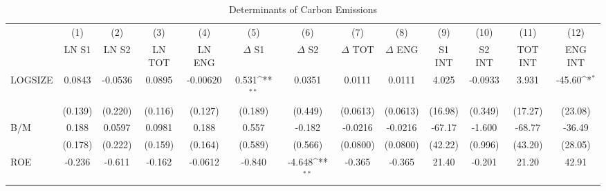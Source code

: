 \begin{table}[htbp]\centering
\def\sym#1{\ifmmode^{#1}\else\(^{#1}\)\fi}
\caption{Determinants of Carbon Emissions}
\begin{tabular}{l*{12}{c}}
\hline\hline
                    &\multicolumn{1}{c}{(1)}&\multicolumn{1}{c}{(2)}&\multicolumn{1}{c}{(3)}&\multicolumn{1}{c}{(4)}&\multicolumn{1}{c}{(5)}&\multicolumn{1}{c}{(6)}&\multicolumn{1}{c}{(7)}&\multicolumn{1}{c}{(8)}&\multicolumn{1}{c}{(9)}&\multicolumn{1}{c}{(10)}&\multicolumn{1}{c}{(11)}&\multicolumn{1}{c}{(12)}\\
                    &\multicolumn{1}{c}{LN S1}&\multicolumn{1}{c}{LN S2}&\multicolumn{1}{c}{LN TOT}&\multicolumn{1}{c}{LN ENG}&\multicolumn{1}{c}{$\Delta$ S1}&\multicolumn{1}{c}{$\Delta$ S2}&\multicolumn{1}{c}{$\Delta$ TOT}&\multicolumn{1}{c}{$\Delta$ ENG}&\multicolumn{1}{c}{S1 INT}&\multicolumn{1}{c}{S2 INT}&\multicolumn{1}{c}{TOT INT}&\multicolumn{1}{c}{ENG INT}\\
\hline
LOGSIZE             &      0.0843         &     -0.0536         &      0.0895         &    -0.00620         &       0.531\sym{**} &      0.0351         &      0.0111         &      0.0111         &       4.025         &     -0.0933         &       3.931         &      -45.60\sym{*}  \\
                    &     (0.139)         &     (0.220)         &     (0.116)         &     (0.127)         &     (0.189)         &     (0.449)         &    (0.0613)         &    (0.0613)         &     (16.98)         &     (0.349)         &     (17.27)         &     (23.08)         \\
B/M                 &       0.188         &      0.0597         &      0.0981         &       0.188         &       0.557         &      -0.182         &     -0.0216         &     -0.0216         &      -67.17         &      -1.600         &      -68.77         &      -36.49         \\
                    &     (0.178)         &     (0.222)         &     (0.159)         &     (0.164)         &     (0.589)         &     (0.566)         &    (0.0800)         &    (0.0800)         &     (42.22)         &     (0.996)         &     (43.20)         &     (28.05)         \\
ROE                 &      -0.236         &      -0.611         &      -0.162         &     -0.0612         &      -0.840         &      -4.648\sym{**} &      -0.365         &      -0.365         &       21.40         &      -0.201         &       21.20         &       42.91         \\

\end{tabular}
\end{table}
